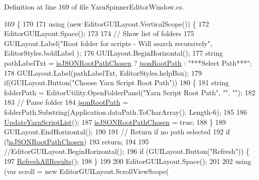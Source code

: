 Definition at line 169 of file Yarn\-Spinner\-Editor\-Window.\-cs.


\begin{DoxyCode}
169                      \{
170 
171             \textcolor{keyword}{using} (\textcolor{keyword}{new} EditorGUILayout.VerticalScope()) \{
172                 EditorGUILayout.Space();
173 
174                 \textcolor{comment}{// Show list of folders}
175                 GUILayout.Label(\textcolor{stringliteral}{"Root folder for scripts - Will search recursively"}, EditorStyles.boldLabel
      );
176                 GUILayout.BeginHorizontal();
177                 \textcolor{keywordtype}{string} pathLabelTxt = \hyperlink{a00166_a85f1c10b20b04052269b0ee2fb71c5af}{isJSONRootPathChosen} ? 
      \hyperlink{a00166_a7599a00e246791ee46a5c549a05975f3}{jsonRootPath} : \textcolor{stringliteral}{"***Select Path***"};
178                 GUILayout.Label(pathLabelTxt, EditorStyles.helpBox);
179                 \textcolor{keywordflow}{if}(GUILayout.Button(\textcolor{stringliteral}{"Choose Yarn Script Root Path"}))
180                 \{
181                     \textcolor{keywordtype}{string} folderPath = EditorUtility.OpenFolderPanel(\textcolor{stringliteral}{"Yarn Script Root Path"}, \textcolor{stringliteral}{""}, \textcolor{stringliteral}{""});
182 
183                     \textcolor{comment}{// Parse folder}
184                     \hyperlink{a00166_a7599a00e246791ee46a5c549a05975f3}{jsonRootPath} = folderPath.Substring(Application.dataPath.ToCharArray().
      Length-6);                    
185                     
186                     \hyperlink{a00166_a406febf62d77eaabc235f6316e537345}{UpdateYarnScriptList}();
187                     \hyperlink{a00166_a85f1c10b20b04052269b0ee2fb71c5af}{isJSONRootPathChosen} = \textcolor{keyword}{true};                    
188                 \}
189                 GUILayout.EndHorizontal();
190 
191                 \textcolor{comment}{// Return if no path selected}
192                 \textcolor{keywordflow}{if} (!\hyperlink{a00166_a85f1c10b20b04052269b0ee2fb71c5af}{isJSONRootPathChosen})
193                     \textcolor{keywordflow}{return};
194 
195                 \textcolor{comment}{//EditorGUILayout.BeginHorizontal();}
196                 \textcolor{keywordflow}{if} (GUILayout.Button(\textcolor{stringliteral}{"Refresh"})) \{
197                     \hyperlink{a00166_ae4faac1a6b0cc9710b20267dc4b88995}{RefreshAllResults}();
198                 \}
199                 
200                 EditorGUILayout.Space();
201 
202                 \textcolor{keyword}{using} (var scroll = \textcolor{keyword}{new} EditorGUILayout.ScrollViewScope(

\end{DoxyCode}
